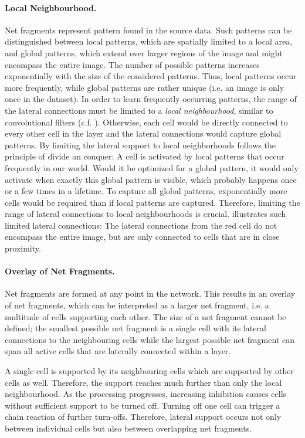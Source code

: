 \paragraph{Local Neighbourhood.} Net fragments represent pattern found in the source data. Such patterns can be distinguished between local patterns, which are spatially limited to a local area, and global patterns, which extend over larger regions of the image and might encompass the entire image.
The number of possible patterns increases exponentially with the size of the considered patterns. Thus, local patterns occur more frequently, while global patterns are rather unique (i.e. an image is only once in the dataset).
In order to learn frequently occurring patterns, the range of the lateral connections must be limited to a \emph{local neighbourhood}, similar to convolutional filters (c.f. ).
Otherwise, each cell would be directly connected to every other cell in the layer and the lateral connections would capture global patterns.
By limiting the lateral support to local neighborhoods follows the principle of divide an conquer: A cell is activated by local patterns that occur frequently in our world. Would it be optimized for a global pattern, it would only activate when exactly this global pattern is visible, which probably happens once or a few times in a lifetime. To capture all global patterns, exponentially more cells would be required than if local patterns are captured. Therefore, limiting the range of lateral connections to local neighbourhoods is crucial.
 illustrates such limited lateral connections: The lateral connections from the red cell do not encompass the entire image, but are only connected to cells that are in close proximity.

\paragraph{Overlay of Net Fragments.} Net fragments are formed at any point in the network. This results in an overlay of net fragments, which can be interpreted as a larger net fragment, i.e. a multitude of cells supporting each other.
The size of a net fragment cannot be defined; the smallest possible net fragment is a single cell with its lateral connections to the neighbouring cells while the largest possible net fragment can span all active cells that are laterally connected within a layer. 

A single cell is supported by its neighbouring cells which are supported by other cells as well. Therefore, the support reaches much further than only the local neighbourhood.
As the processing progresses, increasing inhibition causes cells without sufficient support to be turned off. Turning off one cell can trigger a chain reaction of further turn-offs. Therefore, lateral support occurs not only between individual cells but also between overlapping net fragments.

